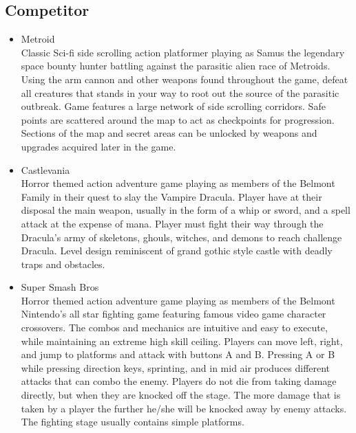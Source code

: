 \documentclass{article}
\begin{document}
\subsection*{Competitor}
    \begin{itemize}
        \item Metroid \\
        Classic Sci-fi side scrolling action platformer playing as Samus the legendary space bounty hunter battling against the parasitic alien race of Metroids. Using the arm cannon and other weapons found throughout the game, defeat all creatures that stands in your way to root out the source of the parasitic outbreak. Game features a large network of side scrolling corridors. Safe points are scattered around the map to act as checkpoints for progression. Sections of the map and secret areas can be unlocked by weapons and upgrades acquired later in the game.
        \item Castlevania \\
        Horror themed action adventure game playing as members of the Belmont Family in their quest to slay the Vampire Dracula. Player have at their disposal the main weapon, usually in the form of a whip or sword, and a spell attack at the expense of mana. Player must fight their way through the Dracula’s army of skeletons, ghouls, witches, and demons to reach challenge Dracula. Level design reminiscent of grand gothic style castle with deadly traps and obstacles.
        \item Super Smash Bros \\
        Horror themed action adventure game playing as members of the Belmont Nintendo’s all star fighting game featuring famous video game character crossovers. The combos and mechanics are intuitive and easy to execute, while maintaining an extreme high skill ceiling. Players can move left, right, and jump to platforms and attack with buttons A and B. Pressing A or B while pressing direction keys, sprinting, and in mid air produces different attacks that can combo the enemy. Players do not die from taking damage directly, but when they are knocked off the stage. The more damage that is taken by a player the further he/she will be knocked away by enemy attacks. The fighting stage usually contains simple platforms.
    \end{itemize}
\end{document}
